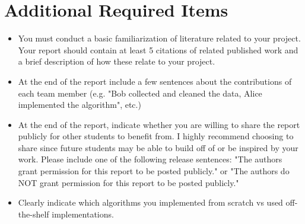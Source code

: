 \documentclass{article}
\begin{document}
\section*{Additional Required Items}

\begin{itemize}[nosep]
    \item You must conduct a basic familiarization of literature related to your project. Your report should contain at least 5 citations of related published work and a brief description of how these relate to your project.
    \item At the end of the report include a few sentences about the contributions of each team member (e.g. "Bob collected and cleaned the data, Alice implemented the algorithm", etc.)
    \item At the end of the report, indicate whether you are willing to share the report publicly for other students to benefit from. I highly recommend choosing to share since future students may be able to build off of or be inspired by your work. Please include one of the following release sentences: "The authors grant permission for this report to be posted publicly." or "The authors do NOT grant permission for this report to be posted publicly."
    \item Clearly indicate which algorithms you implemented from scratch vs used off-the-shelf implementations.
\end{itemize}
\end{document}
